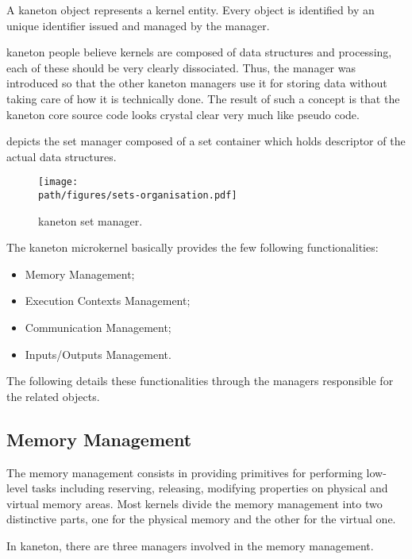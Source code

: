 A kaneton object represents a kernel entity. Every object is identified by
an unique identifier issued and managed by the  manager.

kaneton people believe kernels are composed of data structures and processing,
each of these should be very clearly dissociated. Thus, the 
manager was introduced so that the other kaneton managers use it for storing
data without taking care of how it is technically done. The result of such
a concept is that the kaneton core source code looks crystal clear very much
like pseudo code.

 depicts the set manager
composed of a set container which holds descriptor of the actual data
structures.

\begin{figure}[h]
  \begin{center}
    \texttt{[image: \\path/figures/sets-organisation.pdf]}
    \caption{kaneton set manager.}
    \label{figure:sets-organisation}
  \end{center}
\end{figure}

The kaneton microkernel basically provides the few following functionalities:

\begin{itemize}
  \item
    Memory Management;
  \item
    Execution Contexts Management;
  \item
    Communication Management;
  \item
    Inputs/Outputs Management.
\end{itemize}

The following details these functionalities through the managers responsible
for the related objects.


\subsection*{Memory Management}

The memory management consists in providing primitives for performing low-level
tasks including reserving, releasing, modifying properties on physical and
virtual memory areas. Most kernels divide the memory management into two
distinctive parts, one for the physical memory and the other for the virtual
one.

In kaneton, there are three managers involved in the memory management.

